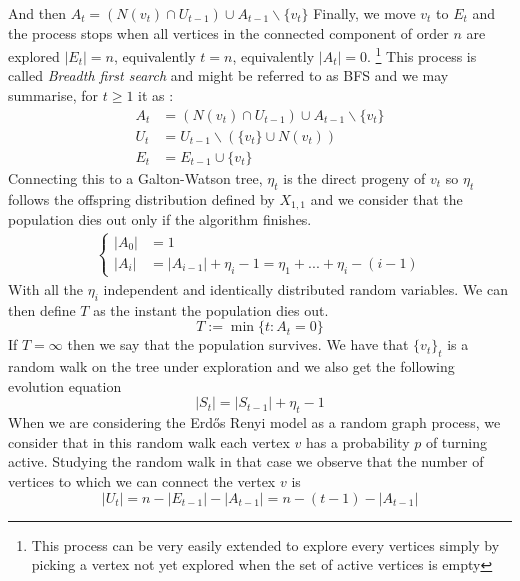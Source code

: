 And then $A_t = (N(v_t)\cap U_{t-1} ) \cup A_{t-1} \backslash \{v_t\}$
Finally, we move $v_t$ to $E_t$ and the process stops when all vertices in the connected component of order $n$ are explored $|E_t| = n$, equivalently $t=n$, equivalently $|A_t| = 0$.
\footnote{This process can be very easily extended to explore every vertices simply by picking a vertex not yet explored when the set of active vertices is empty}
\newline
This process is called \emph{Breadth first search} and might be referred to as BFS and we may summarise, for $t\geq 1$  it as :
\begin{align}
    A_t &= (N(v_t) \cap U_{t-1})\cup A_{t-1} \backslash \{v_t\} \\
    U_t &= U_{t-1}\backslash(\{v_t\}\cup N(v_t) ) \\
    E_t &= E_{t-1}\cup \{v_t\}
\end{align}
Connecting this to a Galton-Watson tree, $\eta_t$ is the direct progeny of $v_t$ so $\eta_t$ follows the offspring distribution defined by $X_{1, 1}$ and we consider that the population dies out only if the algorithm finishes.
\begin{align}\label{activatedV}
	\left\{\begin{array}{rl}
			|A_0| &= 1\\
			|A_i| &= |A_{i-1}| + \eta_i - 1 = \eta_1 + ... + \eta_i - ( i - 1)
	 \end{array}
	\right.
\end{align}
With all the $\eta_i$ independent and identically distributed random variables.
We can then define $T$ as the instant the population dies out.
\begin{equation}
	T := \min\{t: A_t = 0\}
\end{equation}
If $T = \infty$ then we say that the population survives. 
\newline
We have that $\{v_t\}_t$ is a random walk on the tree under exploration and we also get the following evolution equation 
\begin{equation}\label{eq:St}
	|S_t| = |S_{t-1}| + \eta_t - 1
\end{equation}
\newline
When we are considering the Erd\H{o}s Renyi model as a random graph process, we consider that in this random walk each vertex $v$ has a probability $p$ of turning active. 
Studying the random walk in that case we observe that the number of vertices to which we can connect the vertex $v$ is
\begin{equation}
	|U_t| = n - |E_{t-1}| - |A_{t-1}| = n - (t-1) - |A_{t-1}|
\end{equation}
